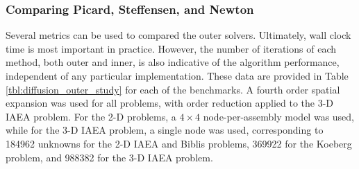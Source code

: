 \subsubsection{Comparing Picard, Steffensen, and Newton}
\label{sec:global_solver_diffusion}

Several metrics can be used to compared the outer solvers. Ultimately, 
wall clock time is most important in practice.  However, the number of 
iterations 
of each method, both outer and inner, is also indicative of the 
algorithm performance, independent of any particular implementation.
These data are provided in Table \ref{tbl:diffusion_outer_study} 
for each of the benchmarks. A fourth
order spatial expansion  was used for all problems, with order reduction 
applied to the 3-D IAEA problem.  For the 2-D problems, a $4\times 4$ 
node-per-assembly model was used, while for the 3-D IAEA problem,  
a single node was used, corresponding to 184962 unknowns for the 
2-D IAEA and Biblis problems, 369922 for the Koeberg problem, 
and 988382 for the 3-D IAEA problem.

